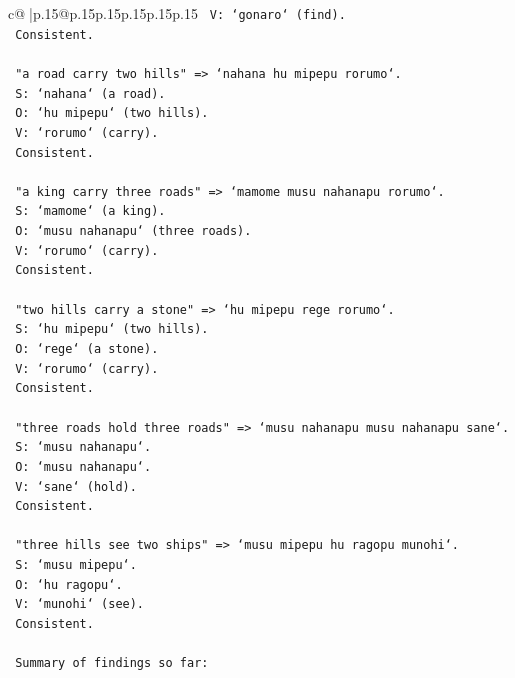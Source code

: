 \documentclass{article}
\begin{document}
{\begin{supertabular}{c@{$\;$}|p{.15\linewidth}@{}p{.15\linewidth}p{.15\linewidth}p{.15\linewidth}p{.15\linewidth}p{.15\linewidth}}
{{{\texttt{     V: `gonaro` (find).} \\
\texttt{     Consistent.} \\
\\ 
\texttt{     "a road carry two hills" => `nahana hu mipepu rorumo`.} \\
\texttt{     S: `nahana` (a road).} \\
\texttt{     O: `hu mipepu` (two hills).} \\
\texttt{     V: `rorumo` (carry).} \\
\texttt{     Consistent.} \\
\\ 
\texttt{     "a king carry three roads" => `mamome musu nahanapu rorumo`.} \\
\texttt{     S: `mamome` (a king).} \\
\texttt{     O: `musu nahanapu` (three roads).} \\
\texttt{     V: `rorumo` (carry).} \\
\texttt{     Consistent.} \\
\\ 
\texttt{     "two hills carry a stone" => `hu mipepu rege rorumo`.} \\
\texttt{     S: `hu mipepu` (two hills).} \\
\texttt{     O: `rege` (a stone).} \\
\texttt{     V: `rorumo` (carry).} \\
\texttt{     Consistent.} \\
\\ 
\texttt{     "three roads hold three roads" => `musu nahanapu musu nahanapu sane`.} \\
\texttt{     S: `musu nahanapu`.} \\
\texttt{     O: `musu nahanapu`.} \\
\texttt{     V: `sane` (hold).} \\
\texttt{     Consistent.} \\
\\ 
\texttt{     "three hills see two ships" => `musu mipepu hu ragopu munohi`.} \\
\texttt{     S: `musu mipepu`.} \\
\texttt{     O: `hu ragopu`.} \\
\texttt{     V: `munohi` (see).} \\
\texttt{     Consistent.} \\
\\ 
\texttt{     Summary of findings so far:} \\
}}}
\end{supertabular}}
\end{document}

